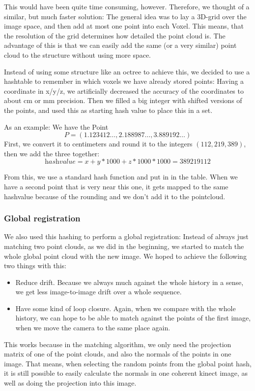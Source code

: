 \documentclass[10pt,twocolumn,letterpaper]{article}
\begin{document}
This would have been quite time consuming, however. Therefore, we thought of a similar, but much faster solution:
The general idea was to lay a 3D-grid over the image space, and then add at most one point into each Voxel. This means, that the resolution
of the grid determines how detailed the point cloud is. The advantage of this is that we can easily add the same (or a very similar) point cloud
to the structure without using more space.

Instead of using some structure like an octree to achieve this, we decided to use a hashtable to remember in which voxels we have already stored points:
Having a coordinate in x/y/z, we artificially decreased the accuracy of the coordinates to about cm or mm precision. Then we filled a big integer with
shifted versions of the points, and used this as starting hash value to place this in a set.

As an example: We have the Point
$$P = (1.123412\ldots, 2.188987\ldots, 3.889192\ldots)$$
First, we convert it to centimeters and round it to the integers $(112, 219, 389)$, then we add the three together:
$$\textit{hashvalue} = x + y*1000 + z*1000*1000 = 389 219 112$$

From this, we use a standard hash function and put in in the table. When we have a second
point that is very near this one, it gets mapped to the same hashvalue because of the rounding and we don't add it to the pointcloud.

\subsubsection{Global registration}
We also used this hashing to perform a global registration: Instead of always just matching two point clouds, as we did in the beginning, we started
to match the whole global point cloud with the new image. We hoped to achieve the following two things with this:
\begin{itemize}
\item Reduce drift. Because we always much against the whole history in a sense, we get less image-to-image drift over a whole sequence.
\item Have some kind of loop closure. Again, when we compare with the whole history, we can hope to be able to match against
the points of the first image, when we move the camera to the same place again.
\end{itemize}

This works because in the matching algorithm, we only need the projection matrix of
one of the point clouds, and also the normals of the points in one image. That means, when selecting the random points from the global point hash, it is
still possible to easily calculate the normals in one coherent kinect image, as well as doing the projection into this image.
\label{globalhashing}
\end{document}

